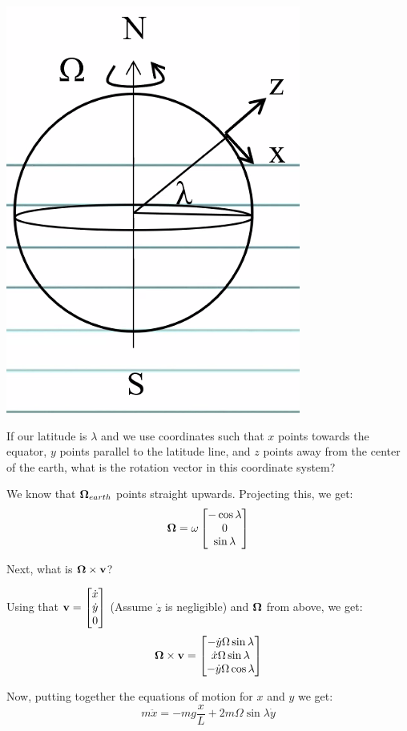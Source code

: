 \documentclass[../PHYS306Notes.tex]{subfiles}
\begin{document}
\begin{center}
    \includegraphics[scale=0.5]{Lecture-16/l16-img3.png}
\end{center}
If our latitude is $\lambda$ and we use coordinates such that $x$ points towards the equator, $y$ points parallel to the latitude line, and $z$ points away from the center of the earth, what is the rotation vector in this coordinate system?
\begin{s}
We know that $\mathbf{\Omega}_{earth}$ points straight upwards. Projecting this, we get:
\[\mathbf{\Omega} = \omega\begin{bmatrix}-\cos\lambda \\ 0 \\ \sin\lambda\end{bmatrix}\]
\end{s}
Next, what is $\mathbf{\Omega} \times \mathbf{v}$?
\begin{s}
Using that $\mathbf{v} = \begin{bmatrix}\dot{x} \\ \dot{y} \\ 0\end{bmatrix}$ (Assume $\dot{z}$ is negligible) and $\mathbf{\Omega}$ from above, we get:
\[\mathbf{\Omega} \times \mathbf{v} = \begin{bmatrix}-\dot{y}\Omega \sin\lambda \\ \dot{x}\Omega\sin\lambda \\ -\dot{y}\Omega\cos\lambda\end{bmatrix}\]
\end{s}
Now, putting together the equations of motion for $x$ and $y$ we get:
\[m\ddot{x} = -mg\frac{x}{L} + 2m\Omega\sin\lambda \dot{y}\]
\end{document}
